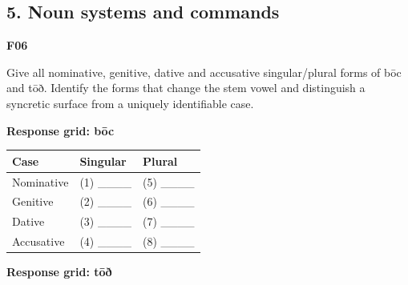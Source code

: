 \par\begin{minipage}{\linewidth}\raggedright
\subsection*{5. Noun systems and commands}


\textbf{F06}

Give all nominative, genitive, dative and accusative singular/\allowbreak{}plural forms of bōc and tōð. Identify the forms that change the stem vowel and distinguish a syncretic surface from a uniquely identifiable case.

\textbf{Response grid: bōc}

\par\begingroup
\fontsize{10.5}{13.2}\selectfont
\setlength{\LTleft}{0pt}\setlength{\LTright}{\fill}
\noindent
\begin{tabular}{@{}>{\raggedright\arraybackslash}p{39.46mm}>{\raggedright\arraybackslash}p{39.46mm}>{\raggedright\arraybackslash}p{39.46mm}@{}}
\toprule
\textbf{Case} & \textbf{Singular} & \textbf{Plural} \\
\midrule
Nominative & (1) \_\_\_\_ & (5) \_\_\_\_ \\
Genitive & (2) \_\_\_\_ & (6) \_\_\_\_ \\
Dative & (3) \_\_\_\_ & (7) \_\_\_\_ \\
Accusative & (4) \_\_\_\_ & (8) \_\_\_\_ \\
\bottomrule
\end{tabular}
\par\endgroup

\textbf{Response grid: tōð}


\end{minipage}

